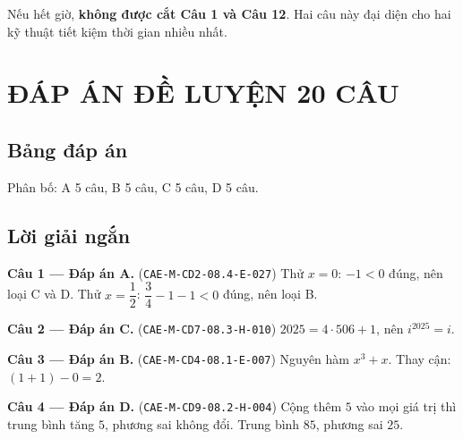 \documentclass[11pt, a4paper]{article}
\begin{document}
Nếu hết giờ, \textbf{không được cắt Câu 1 và Câu 12}. Hai câu này đại diện cho hai kỹ thuật tiết kiệm thời gian nhiều nhất.

\section{ĐÁP ÁN ĐỀ LUYỆN 20 CÂU}

\subsection{Bảng đáp án}



Phân bố: A 5 câu, B 5 câu, C 5 câu, D 5 câu.

\subsection{Lời giải ngắn}

\textbf{Câu 1 — Đáp án A.} (\texttt{CAE-M-CD2-08.4-E-027}) Thử $x = 0$: $-1 < 0$ đúng, nên loại C và D. Thử $x = \dfrac{1}{2}$: $\dfrac{3}{4} - 1 - 1 < 0$ đúng, nên loại B.

\textbf{Câu 2 — Đáp án C.} (\texttt{CAE-M-CD7-08.3-H-010}) $2025 = 4 \cdot 506 + 1$, nên $i^{2025} = i$.

\textbf{Câu 3 — Đáp án B.} (\texttt{CAE-M-CD4-08.1-E-007}) Nguyên hàm $x^3 + x$. Thay cận: $(1 + 1) - 0 = 2$.

\textbf{Câu 4 — Đáp án D.} (\texttt{CAE-M-CD9-08.2-H-004}) Cộng thêm $5$ vào mọi giá trị thì trung bình tăng $5$, phương sai không đổi. Trung bình $85$, phương sai $25$.
\end{document}
